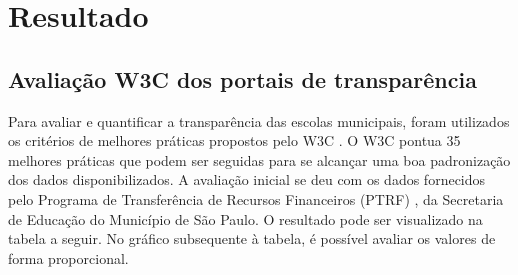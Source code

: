 \chapter{Resultado}

\section{Avaliação W3C dos portais de transparência}

Para avaliar e quantificar a transparência das escolas municipais, foram utilizados os critérios de melhores práticas propostos pelo W3C \cite{W3C}. O W3C pontua 35 melhores práticas \cite{W3CSUMMARY} que podem ser seguidas para se alcançar uma boa padronização dos dados disponibilizados. A avaliação inicial se deu com os dados fornecidos pelo Programa de Transferência de Recursos Financeiros (PTRF) \cite{SP}, da Secretaria de Educação do Município de São Paulo. O resultado pode ser visualizado na tabela a seguir. No gráfico subsequente à tabela, é possível avaliar os valores de forma proporcional.

